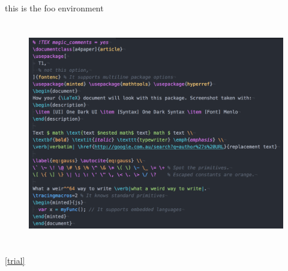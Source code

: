 \documentclass{article}
\begin{document}
\begin{foo} this is the foo environment \end{foo}


\section{}
  



\begin{figure}[h t p b] %
  \centering
  \includegraphics[width=\textwidth]{fig1.png}
\caption{}
  \label{}
\end{figure}
\section{}

\ref{trial}

\cites[][]{world}
\end{document}

